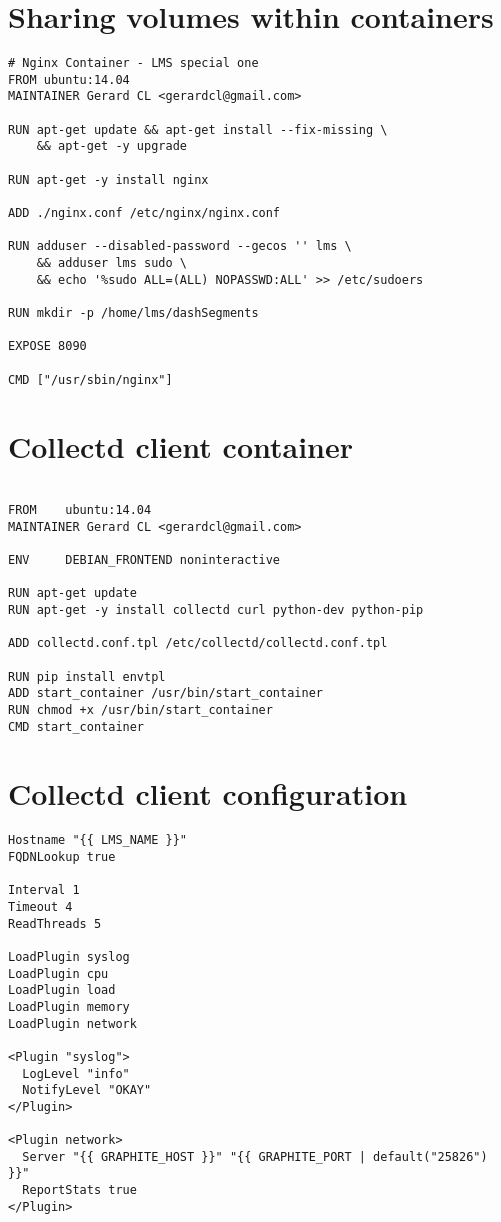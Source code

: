 \section{Sharing volumes within containers}\label{ANX:dockerFiles4}
\begin{verbatim}
# Nginx Container - LMS special one
FROM ubuntu:14.04
MAINTAINER Gerard CL <gerardcl@gmail.com>

RUN apt-get update && apt-get install --fix-missing \
	&& apt-get -y upgrade

RUN apt-get -y install nginx 

ADD ./nginx.conf /etc/nginx/nginx.conf

RUN adduser --disabled-password --gecos '' lms \
	&& adduser lms sudo \
	&& echo '%sudo ALL=(ALL) NOPASSWD:ALL' >> /etc/sudoers

RUN mkdir -p /home/lms/dashSegments

EXPOSE 8090

CMD ["/usr/sbin/nginx"]  
\end{verbatim}

\section{Collectd client container}\label{ANX:dockerFiles5}

\begin{verbatim}

FROM    ubuntu:14.04
MAINTAINER Gerard CL <gerardcl@gmail.com>

ENV     DEBIAN_FRONTEND noninteractive

RUN apt-get update
RUN apt-get -y install collectd curl python-dev python-pip

ADD collectd.conf.tpl /etc/collectd/collectd.conf.tpl

RUN pip install envtpl
ADD start_container /usr/bin/start_container
RUN chmod +x /usr/bin/start_container
CMD start_container

\end{verbatim}

\section{Collectd client configuration}\label{ANX:collectdFiles1}

\begin{verbatim}
Hostname "{{ LMS_NAME }}"
FQDNLookup true

Interval 1
Timeout 4
ReadThreads 5

LoadPlugin syslog
LoadPlugin cpu
LoadPlugin load
LoadPlugin memory
LoadPlugin network

<Plugin "syslog">
  LogLevel "info"
  NotifyLevel "OKAY"
</Plugin>

<Plugin network>
  Server "{{ GRAPHITE_HOST }}" "{{ GRAPHITE_PORT | default("25826") }}"
  ReportStats true
</Plugin>
\end{verbatim}

